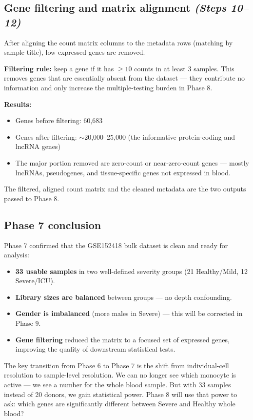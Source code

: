 \documentclass[11pt, a4paper]{article}
\begin{document}
\subsection{Gene filtering and matrix alignment \small\normalfont\textit{(Steps 10–12)}}

After aligning the count matrix columns to the metadata rows (matching by sample title),
low-expressed genes are removed.

\textbf{Filtering rule:} keep a gene if it has $\geq 10$ counts in at least 3 samples.
This removes genes that are essentially absent from the dataset — they contribute
no information and only increase the multiple-testing burden in Phase 8.

\textbf{Results:}
\begin{itemize}[nosep]
  \item Genes before filtering: 60,683
  \item Genes after filtering: $\sim$20,000--25,000 (the informative protein-coding and lncRNA genes)
  \item The major portion removed are zero-count or near-zero-count genes —
        mostly lncRNAs, pseudogenes, and tissue-specific genes not expressed in blood.
\end{itemize}

The filtered, aligned count matrix and the cleaned metadata are the two outputs
passed to Phase 8.

\subsection{Phase 7 conclusion}

Phase 7 confirmed that the GSE152418 bulk dataset is clean and ready for analysis:

\begin{itemize}[nosep]
  \item \textbf{33 usable samples} in two well-defined severity groups (21 Healthy/Mild, 12 Severe/ICU).
  \item \textbf{Library sizes are balanced} between groups — no depth confounding.
  \item \textbf{Gender is imbalanced} (more males in Severe) — this will be corrected in Phase 9.
  \item \textbf{Gene filtering} reduced the matrix to a focused set of expressed genes,
        improving the quality of downstream statistical tests.
\end{itemize}

The key transition from Phase 6 to Phase 7 is the shift from individual-cell resolution to
sample-level resolution. We can no longer see which monocyte is active — we see a number
for the whole blood sample. But with 33 samples instead of 20 donors, we gain statistical
power. Phase 8 will use that power to ask: which genes are significantly different between
Severe and Healthy whole blood?
\end{document}
